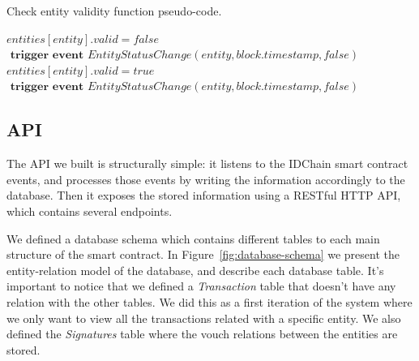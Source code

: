 \begin{algorithm}
  \caption{Check entity validity function pseudo-code.}
  \label{alg:check-entity-validity}
  \begin{algorithmic}[1]
      \State $entities[entity].valid = false$
        \State {}
      \EndFor
      \State $\textbf{ trigger event } EntityStatusChange(entity, block.timestamp, false)$
    \EndIf
    \State
      \State $entities[entity].valid = true$
        \State {}
      \EndFor
      \State $\textbf{ trigger event } EntityStatusChange(entity, block.timestamp, false)$
    \EndIf
    \EndFunction
  \end{algorithmic}
\end{algorithm}


\subsection{API}\label{subsection:api}

The API we built is structurally simple: it listens to the IDChain smart contract events, and processes those events by writing the information accordingly to the database.
Then it exposes the stored information using a RESTful HTTP API, which contains several endpoints.

We defined a database schema which contains different tables to each main structure of the smart contract.
In Figure~\ref{fig:database-schema} we present the entity-relation model of the database, and describe each database table.
It's important to notice that we defined a \textit{Transaction} table that doesn't have any relation with the other tables.
We did this as a first iteration of the system where we only want to view all the transactions related with a specific entity.
We also defined the \textit{Signatures} table where the vouch relations between the entities are stored.

